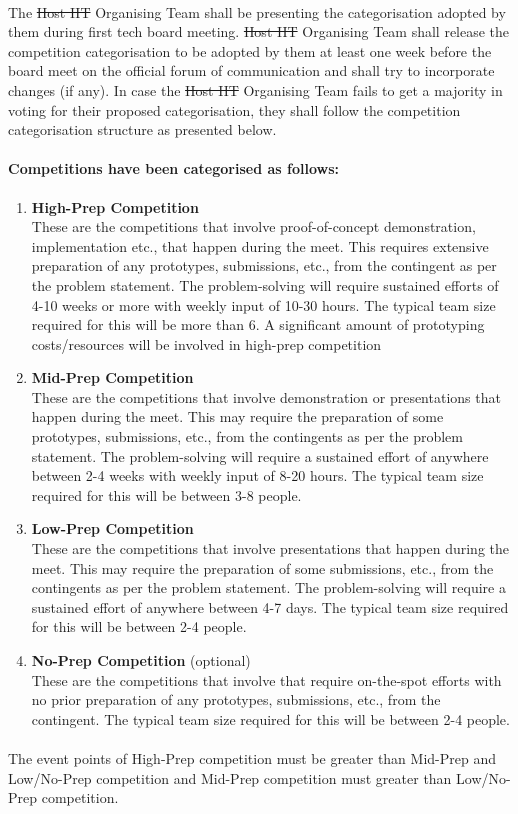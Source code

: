 \paragraph{}
The \st{Host IIT} Organising Team shall be presenting the categorisation adopted by them during first tech board meeting. \st{Host IIT} Organising Team shall release the competition categorisation to be adopted by them at least one week before the board meet on the official forum of communication and shall try to incorporate changes (if any). In case the \st{Host IIT} Organising Team fails to get a majority in voting for their proposed categorisation, they shall follow the competition categorisation structure as presented below.

\paragraph{Competitions have been categorised as follows:}
\begin{enumerate}
    \item 
    \textbf{High-Prep Competition}\\
    These are the competitions that involve proof-of-concept demonstration, implementation etc., that happen during the meet. This requires extensive preparation of any prototypes, submissions, etc., from the contingent as per the problem statement. The problem-solving will require sustained efforts of 4-10 weeks or more with weekly input of 10-30 hours. The typical team size required for this will be more than 6. A significant amount of prototyping costs/resources will be involved in high-prep competition
    \item 
    \textbf{Mid-Prep Competition}\\
    These are the competitions that involve demonstration or presentations that happen during the meet. This may require the preparation of some prototypes, submissions, etc., from the contingents as per the problem statement. The problem-solving will require a sustained effort of anywhere between 2-4 weeks with weekly input of 8-20 hours. The typical team size required for this will be between 3-8 people.
    \item 
    \textbf{Low-Prep Competition}\\
    These are the competitions that involve presentations that happen during the meet. This may require the preparation of some submissions, etc., from the contingents as per the problem statement. The problem-solving will require a sustained effort of anywhere between 4-7 days. The typical team size required for this will be between 2-4 people.
    \item 
    \textbf{No-Prep Competition} (optional)\\
    These are the competitions that involve that require on-the-spot efforts with no prior preparation of any prototypes, submissions, etc., from the contingent. The typical team size required for this will be between 2-4 people.
\end{enumerate}

\paragraph{}
The event points of High-Prep competition must be greater than Mid-Prep and Low/No-Prep competition and Mid-Prep competition must greater than Low/No-Prep competition.